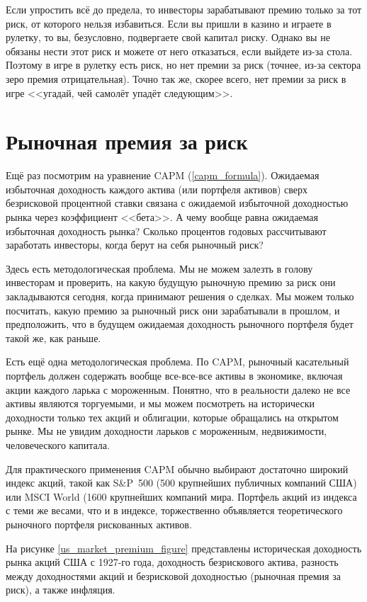 Если упростить всё до предела, то инвесторы зарабатывают премию только за тот риск, от которого нельзя избавиться. Если вы пришли в казино и играете в рулетку, то вы, безусловно, подвергаете свой капитал риску. Однако вы не обязаны нести этот риск и можете от него отказаться, если выйдете из-за стола. Поэтому в игре в рулетку есть риск, но нет премии за риск (точнее, из-за сектора зеро премия отрицательная). Точно так же, скорее всего, нет премии за риск в игре <<угадай, чей самолёт упадёт следующим>>.

\section*{Рыночная премия за риск}

Ещё раз посмотрим на уравнение CAPM (\ref{capm_formula}). Ожидаемая избыточная доходность каждого актива (или портфеля активов) сверх безрисковой процентной ставки связана с ожидаемой избыточной доходностью рынка через коэффициент <<бета>>. А чему вообще равна ожидаемая избыточная доходность рынка? Сколько процентов годовых рассчитывают заработать инвесторы, когда берут на себя рыночный риск?

Здесь есть методологическая проблема. Мы не можем залезть в голову инвесторам и проверить, на какую будущую рыночную премию за риск они закладываются сегодня, когда принимают решения о сделках. Мы можем только посчитать, какую премию за рыночный риск они зарабатывали в прошлом, и предположить, что в будущем ожидаемая доходность рыночного портфеля будет такой же, как раньше.

Есть ещё одна методологическая проблема. По CAPM, рыночный касательный портфель должен содержать вообще все-все-все активы в экономике, включая акции каждого ларька с мороженным. Понятно, что в реальности далеко не все активы являются торгуемыми, и мы можем посмотреть на исторически доходности только тех акций и облигации, которые обращались на открытом рынке. Мы не увидим доходности ларьков с мороженным, недвижимости, человеческого капитала.

Для практического применения CAPM обычно выбирают достаточно широкий индекс акций, такой как S\&P~500 (500 крупнейших публичных компаний США) или MSCI World (1600 крупнейших компаний мира. Портфель акций из индекса с теми же весами, что и в индексе, торжественно объявляется  теоретического рыночного портфеля рискованных активов.

На рисунке \ref{us_market_premium_figure} представлены историческая доходность рынка акций США с 1927-го года, доходность безрискового актива, разность между доходностями акций и безрисковой доходностью (рыночная премия за риск), а также инфляция.

